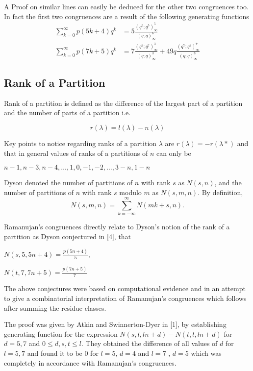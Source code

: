 A Proof on similar lines can easily be deduced for the other two congruences too.
\newpage
In fact the first two congruences are a result of the following generating functions
\begin{align*}
    \sum_{k=0}^\infty p(5k+4)q^k &= 5\frac{(q^5;q^5)^5_\infty}{(q;q)^6_\infty}\\
    \sum_{k=0}^\infty p(7k+5)q^k &= 7\frac{(q^7;q^7)^3_\infty}{(q;q)^3_\infty} + 49q\frac{(q^7;q^7)^7_\infty}{(q;q)^8_\infty}
\end{align*}



\subsection{Rank of a Partition}

Rank of a partition is defined as the difference of the largest part of a partition and the number of parts of a partition i.e.

\begin{equation}
    r(\lambda) = l(\lambda) - n(\lambda)
\end{equation}

Key points to notice regarding ranks of a partition $\lambda$ are $r(\lambda) = -r(\lambda*)$ and that in general values of ranks of a partitions of $n$ can only be
\begin{center}
    $n-1,n-3,n-4,\dots,1,0,-1,-2,\dots, 3-n,1-n$
\end{center}

Dyson denoted the number of partitions of $n$ with rank $s$ as $N(s,n)$, and the number of partitions of $n$ with rank $s$ modulo $m$ as $N(s,m,n)$. By definition, $$N(s,m,n) = \sum_{k=-\infty}^\infty N(mk+s,n).$$

Ramanujan's congruences directly relate to Dyson's notion of the rank of a partition as Dyson conjectured in [4], that 
\begin{center}
    $N(s,5,5n+4) = \frac{p(5n+4)}{5},$
    
    $N(t,7,7n+5) = \frac{p(7n+5)}{7}$
\end{center}
\newpage
The above conjectures were based on computational evidence and in an attempt to give a combinatorial interpretation of Ramanujan's congruences which follows after summing the residue classes.

The proof was given by Atkin and Swinnerton-Dyer in [1], by establishing generating function for the expression $N(s,l,ln+d)-N(t,l,ln+d) $ for $d = 5, 7$ and $0 \leq d,s,t \leq l$. They obtained the difference of all values of $d$ for $l = 5, 7$ and found it to be 0 for $l = 5$, $d = 4$ and $l = 7$ , $d = 5$ which was completely in accordance with Ramanujan's congruences.

